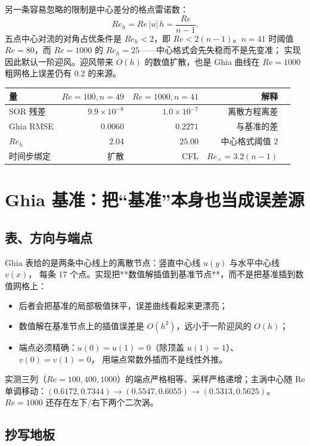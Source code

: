 另一条容易忽略的限制是中心差分的格点雷诺数：
\[
  Re_h=Re\,|u|\,h=\frac{Re}{n-1}.
\]
五点中心对流的对角占优条件是 $Re_h<2$，即 $Re<2(n-1)$。$n=41$ 时阈值
$Re=80$，而 $Re=1000$ 的 $Re_h=25$——中心格式会先失稳而不是先变准；
实现因此默认一阶迎风。迎风带来 $O(h)$ 的数值扩散，也是 Ghia 曲线在
$Re=1000$ 粗网格上误差仍有 $0.2$ 的来源。

\begin{center}
\begin{tabular}{lrrrr}
\toprule
量 & $Re=100,n=49$ & $Re=1000,n=41$ & 解释 \\
\midrule
SOR 残差 & $9.9\times10^{-8}$ & $1.0\times10^{-7}$ & 离散方程离差 \\
Ghia RMSE & $0.0060$ & $0.2271$ & 与基准的差 \\
$Re_h$ & $2.04$ & $25.00$ & 中心格式阈值 $2$ \\
时间步绑定 & 扩散 & CFL & $Re_\times=3.2(n-1)$ \\
\bottomrule
\end{tabular}
\end{center}

\section{Ghia 基准：把“基准”本身也当成误差源}\label{sec:ghia}

\subsection{表、方向与端点}

Ghia 表给的是两条中心线上的离散节点：竖直中心线 $u(y)$ 与水平中心线 $v(x)$，
每条 17 个点。实现把**数值解插值到基准节点**，而不是把基准插到数值网格上：

\begin{itemize}
  \item 后者会把基准的局部极值抹平，误差曲线看起来更漂亮；
  \item 数值解在基准节点上的插值误差是 $O(h^2)$，远小于一阶迎风的 $O(h)$；
  \item 端点必须精确：$u(0)=u(1)=0$（除顶盖 $u(1)=1$）、$v(0)=v(1)=0$，
        用端点常数外插而不是线性外推。
\end{itemize}

实测三列（$Re=100,400,1000$）的端点严格相等、采样严格递增；主涡中心随 Re
单调移动：$(0.6172,0.7344)\to(0.5547,0.6055)\to(0.5313,0.5625)$。
$Re=1000$ 还存在左下/右下两个二次涡。

\subsection{抄写地板}

